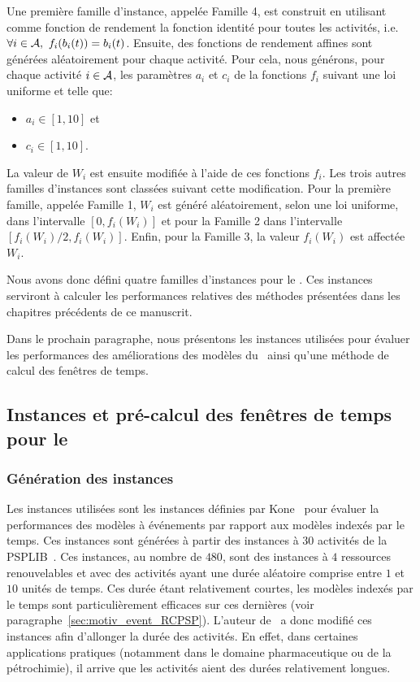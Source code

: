 Une première famille d'instance, appelée Famille 4, est construit en
utilisant comme fonction de rendement la fonction identité pour toutes
les activités, i.e. $\forall i \in \A,\ f_i(b_i(t))= b_i(t)$. Ensuite,
des fonctions de rendement affines sont générées aléatoirement pour
chaque activité. Pour cela, nous générons, pour chaque activité $i \in
{\cal A}$, les paramètres $a_i$ et $c_i$ de la fonctions $f_i$ suivant une
loi uniforme et telle que:
\begin{itemize}
\item $a_i \in [1,10]$ et
\item $c_i \in [1,10]$.
\end{itemize} La valeur de $W_i$ est ensuite modifiée à l'aide de ces
fonctions $f_i$. Les trois autres familles d'instances sont classées
suivant cette modification. Pour la première famille, appelée Famille
1, $W_i$ est généré aléatoirement, selon une loi uniforme, dans
l'intervalle $[0,f_i(W_i)]$ et pour la Famille 2 dans l'intervalle
$[f_i(W_i)/2, f_i(W_i)]$. Enfin, pour la Famille 3, la valeur
$f_i(W_i)$ est affectée $W_i$. 

Nous avons donc défini quatre familles d'instances pour le \CECSP. Ces
instances serviront à calculer les performances relatives des méthodes
présentées dans les chapitres précédents de ce manuscrit. 

Dans le prochain paragraphe, nous présentons les instances utilisées
pour évaluer les performances des améliorations des modèles du
\RCPSP~ainsi qu'une méthode de calcul des fenêtres de temps.
  
\subsection{Instances et pré-calcul des fenêtres de temps pour le
  \RCPSP}
\label{sec:instances_RCPSP}
\subsubsection{Génération des instances}
Les instances utilisées sont les instances définies par
Kone~\cite{theseOumar} pour évaluer la performances des modèles à
événements par rapport aux modèles indexés par le temps. Ces instances
sont générées à partir des instances à $30$ activités de la
PSPLIB~\cite{PSPLIB}. Ces instances, au nombre de $480$, sont des
instances à $4$ ressources renouvelables et avec des activités ayant
une durée aléatoire comprise entre $1$ et $10$ unités de temps. Ces
durée étant relativement courtes, les modèles indexés par le temps
sont particulièrement efficaces sur ces dernières (voir
paragraphe~\ref{sec:motiv_event_RCPSP}). L'auteur de~\cite{theseOumar}
a donc modifié ces instances afin d'allonger la durée des
activités. En effet, dans certaines applications pratiques (notamment
dans le domaine pharmaceutique ou de la pétrochimie), il arrive que
les activités aient des durées relativement longues.


